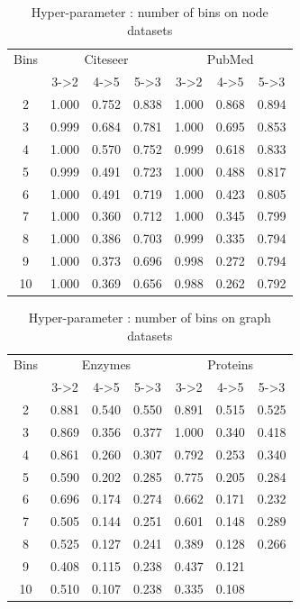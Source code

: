 \documentclass[sigconf]{acmart}
\begin{document}
\begin{table}[htb]
  \caption{Hyper-parameter : number of bins on node datasets}
  \label{tab:commands}
  \begin{tabular}{*{7}{c}} \toprule
{Bins}  & \multicolumn{3}{c}{{\sc Citeseer}} & \multicolumn{3}{c}{{\sc PubMed}} \\
\cmidrule(lr){2-4}\cmidrule(lr){5-7}
& 3->2 & 4->5 & 5->3 & 3->2 & 4->5 & 5->3 \\ \hline
2 & 1.000& 0.752 & 0.838 & 1.000  & 0.868 & 0.894\\
3 & 0.999& 0.684 & 0.781 & 1.000  & 0.695 & 0.853\\
4 & 1.000& 0.570 & 0.752& 0.999 & 0.618 & 0.833\\
5 & 0.999& 0.491 & 0.723& 1.000  & 0.488 & 0.817\\
6 & 1.000& 0.491 & 0.719& 1.000 & 0.423 & 0.805\\
7 & 1.000& 0.360 & 0.712& 1.000  & 0.345 & 0.799\\
8 & 1.000& 0.386 & 0.703& 0.999 & 0.335 & 0.794 \\
9 & 1.000& 0.373 & 0.696& 0.998  & 0.272 & 0.794\\
10 & 1.000& 0.369 & 0.656& 0.988 &0.262 & 0.792\\
\bottomrule
  \end{tabular}
\end{table}
\begin{table}[htb]
  \caption{Hyper-parameter : number of bins on graph datasets}
  \label{tab:commands}
  \begin{tabular}{*{7}{c}} \toprule
{Bins}  & \multicolumn{3}{c}{{\sc Enzymes}} & \multicolumn{3}{c}{{\sc Proteins}} \\
\cmidrule(lr){2-4}\cmidrule(lr){5-7}
& 3->2 & 4->5 & 5->3 & 3->2 & 4->5 & 5->3 \\ \hline
2 & 0.881 & 0.540 & 0.550 & 0.891 & 0.515 & 0.525\\
3 & 0.869 & 0.356 & 0.377 & 1.000 & 0.340 & 0.418\\
4 & 0.861 & 0.260 & 0.307 & 0.792 & 0.253 & 0.340\\
5 & 0.590 & 0.202 & 0.285 & 0.775 & 0.205 & 0.284\\
6 & 0.696 & 0.174 & 0.274 & 0.662 & 0.171 & 0.232\\
7 & 0.505 & 0.144 & 0.251 & 0.601 & 0.148 & 0.289\\
8 & 0.525 & 0.127 & 0.241 & 0.389 & 0.128 & 0.266\\
9 & 0.408 & 0.115 & 0.238 & 0.437 & 0.121 & \\
10 & 0.510 & 0.107 & 0.238 & 0.335 & 0.108 & \\

\bottomrule
  \end{tabular}
\end{table}
\end{document}
